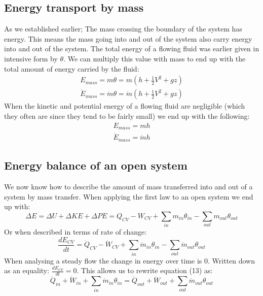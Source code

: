 \documentclass[11pt, a4paper]{article}
\begin{document}
\subsection{Energy transport by mass}
As we established earlier; The mass crossing the boundary of the system has energy. This means the mass going into and out of the system also carry energy into and out of the system. The total energy of a flowing fluid was earlier given in intensive form by $\theta$. We can multiply this value with mass to end up with the total amount of energy carried by the fluid:
\begin{gather}
  E_{mass} = m \theta = m \left( h + \frac{1}{2}V^2 + gz \right)\\
  \dot{E}_{mass} = \dot{m} \theta = \dot{m} \left( h + \frac{1}{2}V^2 + gz \right)
\end{gather}
When the kinetic and potential energy of a flowing fluid are negligible (which they often are since they tend to be fairly small) we end up with the following:
\begin{gather}
  E_{mass} = mh\\
  \dot{E}_{mass} = \dot{m}h
\end{gather}


\subsection{Energy balance of an open system}
We now know how to describe the amount of mass transferred into and out of a system by mass transfer. When applying the first law to an open system we end up with:
\begin{equation}
  \Delta E = \Delta U + \Delta KE + \Delta PE = Q_{CV} - W_{CV} + \sum_{in} m_{in}\theta_{in} - \sum_{out} m_{out} \theta_{out} 
\end{equation}
Or when described in terms of rate of change:
\begin{equation}
  \frac{dE_{CV}}{dt} = \dot{Q}_{CV} - \dot{W}_{CV} + \sum_{in} \dot{m}_{in}\theta_{in} - \sum_{out} \dot{m}_{out} \theta_{out}
\end{equation}
When analysing a steady flow the change in energy over time is $0$. Written down as an equality: $\frac{dE_{CV}}{dt} = 0$. This allows us to rewrite equation (13) as:
\begin{equation}
  \dot{Q}_{in} + \dot{W}_{in} + \sum_{in} \dot{m}_{in} \theta_{in}  = \dot{Q}_{out} + \dot{W}_{out} + \sum_{out} \dot{m}_{out} \theta_{out}
\end{equation}
\end{document}
